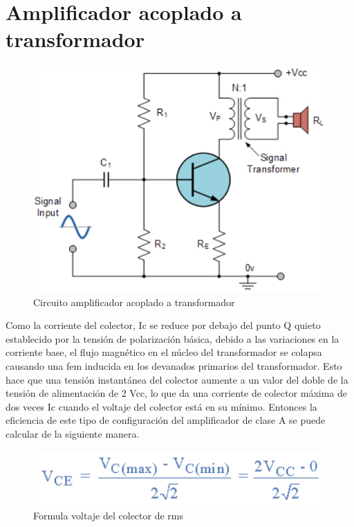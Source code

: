\documentclass[12pt,a4paper]{article}
\begin{document}
\section*{Amplificador acoplado a transformador}
\begin{figure}[hbtp]
\centering
\includegraphics[scale=0.7]{Circuitos/7.png}
\caption{Circuito amplificador acoplado a transformador}
\end{figure}
\newpage
Como la corriente del colector, Ic se reduce por debajo del punto Q quieto establecido por la tensión de polarización básica, debido a las variaciones en la corriente base, el flujo magnético en el núcleo del transformador se colapsa causando una fem inducida en los devanados primarios del transformador. Esto hace que una tensión instantánea del colector aumente a un valor del doble de la tensión de alimentación de 2 Vcc, lo que da una corriente de colector máxima de dos veces Ic cuando el voltaje del colector está en su mínimo. Entonces la eficiencia de este tipo de configuración del amplificador de clase A se puede calcular de la siguiente manera.\\
\begin{figure}[hbtp]
\centering
\includegraphics[scale=0.7]{Circuitos/8.png}
\caption{Formula voltaje del colector de rms}
\end{figure}
\end{document}
